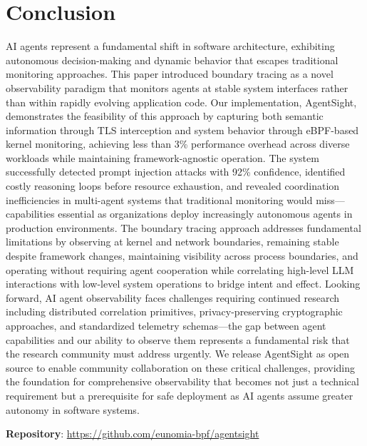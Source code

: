 \section{Conclusion}

AI agents represent a fundamental shift in software architecture, exhibiting autonomous decision-making and dynamic behavior that escapes traditional monitoring approaches. This paper introduced boundary tracing as a novel observability paradigm that monitors agents at stable system interfaces rather than within rapidly evolving application code. Our implementation, AgentSight, demonstrates the feasibility of this approach by capturing both semantic information through TLS interception and system behavior through eBPF-based kernel monitoring, achieving less than 3\% performance overhead across diverse workloads while maintaining framework-agnostic operation. The system successfully detected prompt injection attacks with 92\% confidence, identified costly reasoning loops before resource exhaustion, and revealed coordination inefficiencies in multi-agent systems that traditional monitoring would miss—capabilities essential as organizations deploy increasingly autonomous agents in production environments. The boundary tracing approach addresses fundamental limitations by observing at kernel and network boundaries, remaining stable despite framework changes, maintaining visibility across process boundaries, and operating without requiring agent cooperation while correlating high-level LLM interactions with low-level system operations to bridge intent and effect. Looking forward, AI agent observability faces challenges requiring continued research including distributed correlation primitives, privacy-preserving cryptographic approaches, and standardized telemetry schemas—the gap between agent capabilities and our ability to observe them represents a fundamental risk that the research community must address urgently. We release AgentSight as open source to enable community collaboration on these critical challenges, providing the foundation for comprehensive observability that becomes not just a technical requirement but a prerequisite for safe deployment as AI agents assume greater autonomy in software systems.

\textbf{Repository}: \url{https://github.com/eunomia-bpf/agentsight}




